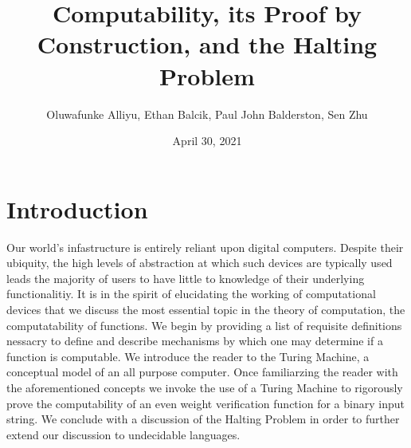 \documentclass{article}
\title{Computability, its Proof by Construction, and the Halting Problem}
\author{Oluwafunke Alliyu, Ethan Balcik, Paul John Balderston, Sen Zhu}
\date{April 30, 2021}
\begin{document}
\theoremstyle{definition}
\newtheorem{exmp}{Example}[section]
\newtheorem{defin}{Definition}[section]
\newtheorem{prf}{Proof}[section]

\maketitle

\section{Introduction}
Our world’s infastructure is entirely reliant upon digital computers. Despite
their ubiquity, the high levels of abstraction at which such devices are typically
used leads the majority of users to have little to knowledge of their underlying
functionalitiy. It is in the spirit of elucidating the working of computational
devices that we discuss the most essential topic in the theory of computation, the
computatability of functions. We begin by providing a list of requisite definitions
nessacry to define and describe mechanisms by which one may determine if a
function is computable. We introduce the reader to the Turing Machine, a
conceptual model of an all purpose computer. Once familiarzing the reader
with the aforementioned concepts we invoke the use of a Turing Machine to
rigorously prove the computability of an even weight verification function for
a binary input string. We conclude with a discussion of the Halting Problem in
order to further extend our discussion to undecidable languages. \cite{1}
\end{document}
